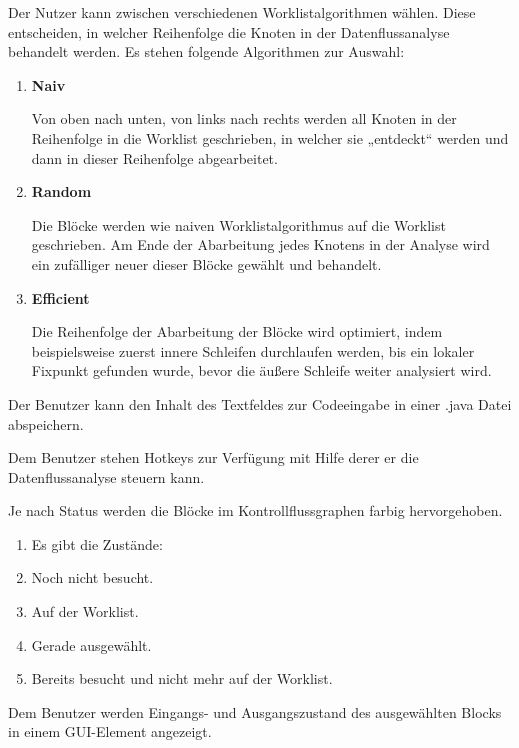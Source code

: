 Der Nutzer kann zwischen verschiedenen Worklistalgorithmen wählen. Diese
entscheiden, in welcher Reihenfolge die Knoten in der Datenflussanalyse behandelt
werden. Es stehen folgende Algorithmen zur Auswahl:
\begin{enumerate}[label=(\alph*)]
\item \textbf{Naiv} \par
Von oben nach unten, von links nach rechts werden all Knoten in der Reihenfolge in
die Worklist geschrieben, in welcher sie „entdeckt“ werden und dann in dieser
Reihenfolge abgearbeitet.
\item \textbf{Random} \par
Die Blöcke werden wie naiven Worklistalgorithmus auf die Worklist geschrieben. Am Ende der Abarbeitung jedes Knotens in der Analyse wird ein
zufälliger neuer dieser Blöcke gewählt und behandelt.
\item \textbf{Efficient} \par
Die Reihenfolge der Abarbeitung der Blöcke wird optimiert, indem beispielsweise
zuerst innere Schleifen durchlaufen werden, bis ein lokaler Fixpunkt gefunden wurde, bevor die äußere Schleife weiter analysiert wird.
\end{enumerate}

Der Benutzer kann den Inhalt des Textfeldes zur Codeeingabe in einer .java Datei abspeichern.

Dem Benutzer stehen Hotkeys zur Verfügung mit Hilfe derer er die Datenflussanalyse steuern kann.

Je nach Status werden die Blöcke im Kontrollflussgraphen farbig hervorgehoben.
\begin{enumerate}[label=(\alph*)]
\item Es gibt die Zustände:
\item Noch nicht besucht.
\item Auf der Worklist.
\item Gerade ausgewählt.
\item Bereits besucht und nicht mehr auf der Worklist.
\end{enumerate}

Dem Benutzer werden Eingangs- und Ausgangszustand des ausgewählten Blocks in einem GUI-Element angezeigt.

